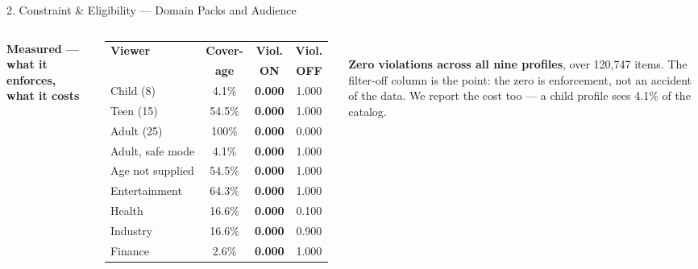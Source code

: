 \documentclass[aspectratio=169, 11pt]{beamer}
\newcommand{\eqs}{%
  \setlength{\abovedisplayskip}{3pt}%
  \setlength{\belowdisplayskip}{3pt}%
  \setlength{\abovedisplayshortskip}{2pt}%
  \setlength{\belowdisplayshortskip}{2pt}}
\newcommand{\blk}[1]{{\scriptsize\eqs\textbf{#1}}\par\vspace{0.9mm}}
\begin{document}
\begin{frame}[shrink]{2. Constraint \& Eligibility --- Domain Packs and Audience}
\begin{columns}[T]
\blk{Measured --- what it enforces, what it costs}
{\tiny\eqs
\renewcommand{\arraystretch}{1.38}
\begin{tabular}{p{1.95cm} c c c}
\toprule
\textbf{Viewer} & \textbf{Cover-} & \textbf{Viol.} & \textbf{Viol.}\\
                & \textbf{age}    & \textbf{ON}    & \textbf{OFF}\\
\midrule
Child (8)        & 4.1\%  & \textbf{0.000} & 1.000\\
Teen (15)        & 54.5\% & \textbf{0.000} & 1.000\\
Adult (25)       & 100\%  & \textbf{0.000} & 0.000\\
Adult, safe mode & 4.1\%  & \textbf{0.000} & 1.000\\
Age not supplied & 54.5\% & \textbf{0.000} & 1.000\\
\midrule
Entertainment    & 64.3\% & \textbf{0.000} & 1.000\\
Health           & 16.6\% & \textbf{0.000} & 0.100\\
Industry         & 16.6\% & \textbf{0.000} & 0.900\\
Finance          & 2.6\%  & \textbf{0.000} & 1.000\\
\bottomrule
\end{tabular}}\\[2.5mm]
{\tiny \textbf{Zero violations across all nine profiles}, over 120{,}747 items. The filter-off
column is the point: the zero is enforcement, not an accident of the data. We report the cost
too --- a child profile sees 4.1\% of the catalog.}
\end{columns}
\vspace{2mm}
\end{frame}
\end{document}
